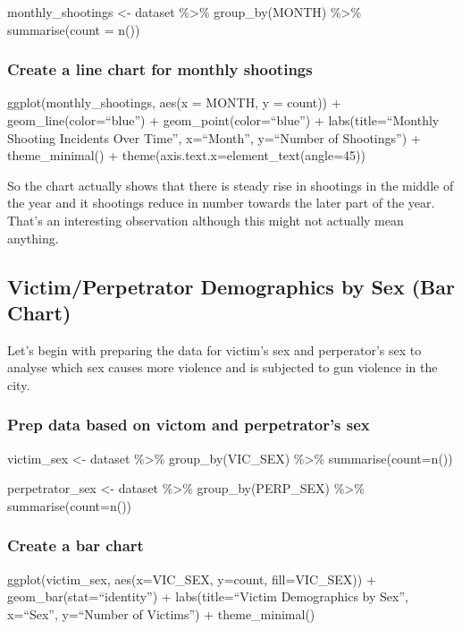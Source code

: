 \documentclass[
]{article}
\begin{document}
monthly\_shootings \textless- dataset \%\textgreater\% group\_by(MONTH)
\%\textgreater\% summarise(count = n())

\subsubsection{Create a line chart for monthly
shootings}\label{create-a-line-chart-for-monthly-shootings}

ggplot(monthly\_shootings, aes(x = MONTH, y = count)) +
geom\_line(color=``blue'') + geom\_point(color=``blue'') +
labs(title=``Monthly Shooting Incidents Over Time'', x=``Month'',
y=``Number of Shootings'') + theme\_minimal() +
theme(axis.text.x=element\_text(angle=45))

So the chart actually shows that there is steady rise in shootings in
the middle of the year and it shootings reduce in number towards the
later part of the year. That's an interesting observation although this
might not actually mean anything.

\subsection{Victim/Perpetrator Demographics by Sex (Bar
Chart)}\label{victimperpetrator-demographics-by-sex-bar-chart}

Let's begin with preparing the data for victim's sex and perperator's
sex to analyse which sex causes more violence and is subjected to gun
violence in the city.

\subsubsection{Prep data based on victom and perpetrator's
sex}\label{prep-data-based-on-victom-and-perpetrators-sex}

victim\_sex \textless- dataset \%\textgreater\% group\_by(VIC\_SEX)
\%\textgreater\% summarise(count=n())

perpetrator\_sex \textless- dataset \%\textgreater\%
group\_by(PERP\_SEX) \%\textgreater\% summarise(count=n())

\subsubsection{Create a bar chart}\label{create-a-bar-chart}

ggplot(victim\_sex, aes(x=VIC\_SEX, y=count, fill=VIC\_SEX)) +
geom\_bar(stat=``identity'') + labs(title=``Victim Demographics by
Sex'', x=``Sex'', y=``Number of Victims'') + theme\_minimal()
\end{document}
